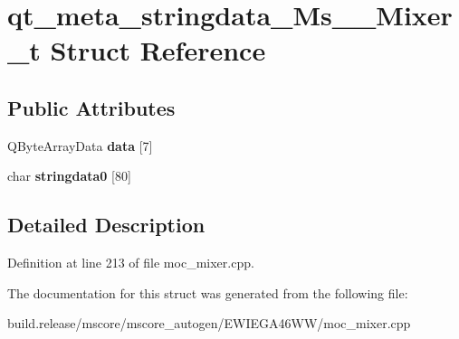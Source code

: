\hypertarget{structqt__meta__stringdata___ms_____mixer__t}{}\section{qt\+\_\+meta\+\_\+stringdata\+\_\+\+Ms\+\_\+\+\_\+\+Mixer\+\_\+t Struct Reference}
\label{structqt__meta__stringdata___ms_____mixer__t}
\subsection*{Public Attributes}
\begin{DoxyCompactItemize}
\item 
\mbox{\label{structqt__meta__stringdata___ms_____mixer__t_a6f47df16909b09421f16f40b64c4df22}} 
Q\+Byte\+Array\+Data {\bfseries data} \mbox{[}7\mbox{]}
\item 
\mbox{\label{structqt__meta__stringdata___ms_____mixer__t_a81e08d1b71081d622bb4c479e3a789d6}} 
char {\bfseries stringdata0} \mbox{[}80\mbox{]}
\end{DoxyCompactItemize}


\subsection{Detailed Description}


Definition at line 213 of file moc\+\_\+mixer.\+cpp.



The documentation for this struct was generated from the following file\+:\begin{DoxyCompactItemize}
\item 
build.\+release/mscore/mscore\+\_\+autogen/\+E\+W\+I\+E\+G\+A46\+W\+W/moc\+\_\+mixer.\+cpp\end{DoxyCompactItemize}
